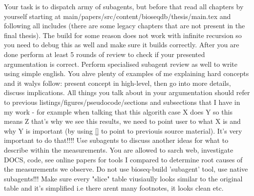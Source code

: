 Your task is to dispatch army of subagents, but before that read all chapters by yourself starting at main/papers/src/content/bioseqdb/thesis/main.tex and following all includes
(there are some legacy chapters that are not present in the final thesis). The build for some reason does not work with infinite recursion so you need to debug this as well and make sure it builds correctly.
After you are done perform at least 5 rounds of review to check if your presented argumentation is correct. Perform specialised subagent review as well to write using simple english. You ahve plenty of examples of me explaining hard concepts and it walys follow: present concept in high-level, then go into more details, discuss implications.
All things you talk about in your argumentation should refer to previous listings/figures/pseudocode/sections and subsections that I have in my work - for example when talking that this algorith case X does Y so this means Z that's why we see this results, 
we need to point user to what X is and why Y is important (by using \ref{} to point to previouis source material). It's very important to do that!!!!
Use subagents to discuss another ideas for what to describe within the measurements. You are allowed to sarch web, investigate DOCS, code, see online papers for tools I compared to determine root causes of the measurements we observe.
Do not use bioseq-build 'subagent' tool, use native subagents!!!
Make sure every "slice" table viusiaully looks similar to the original table and it's simplified i.e there arent many footnotes, it looks clean etc.

